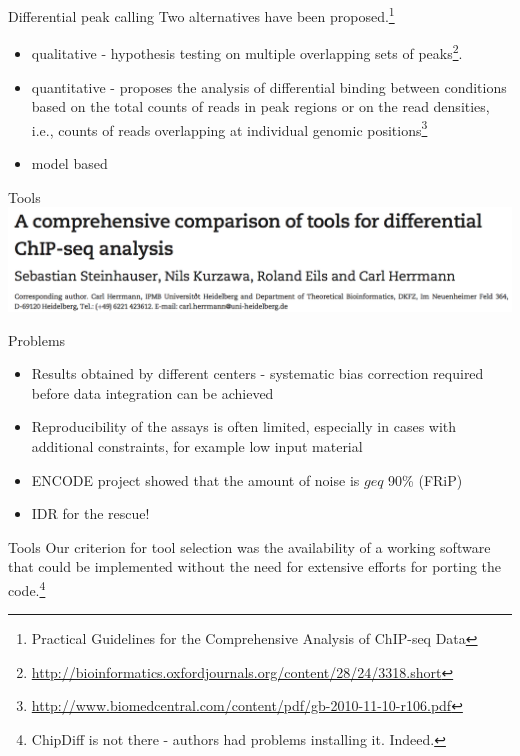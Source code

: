 \documentclass{beamer}
\begin{document}
\begin{frame}{Differential peak calling}
Two alternatives have been proposed.\footnote{Practical Guidelines for the Comprehensive Analysis of ChIP-seq Data}
\begin{itemize}
\item qualitative - hypothesis testing on multiple overlapping sets of peaks\footnote{\url{http://bioinformatics.oxfordjournals.org/content/28/24/3318.short}}.
\item quantitative -  proposes the analysis of differential binding between conditions based on the total counts of reads in peak regions or on the read densities, i.e., counts of reads overlapping at individual genomic positions\footnote{\url{http://www.biomedcentral.com/content/pdf/gb-2010-11-10-r106.pdf}}
\item model based
\end{itemize}
\end{frame}

\begin{frame}{Tools}
\includegraphics[width=\linewidth]{paperDPC.png}
\end{frame}

\begin{frame}{Problems}
\begin{itemize}
\item  Results obtained by different centers -  systematic bias correction required before data integration can be achieved
\item Reproducibility of the assays is often limited, especially in cases with additional constraints, for example low input material
\item ENCODE project showed that the amount of noise is ${geq}$ 90\% (FRiP)
\item IDR for the rescue!
\end{itemize}
\end{frame}

\begin{frame}{Tools}
 Our criterion for tool selection was the availability of a working software that could be implemented without the need for extensive efforts for porting the code.\footnote{ChipDiff is not there - authors had problems installing it. Indeed.}
\end{frame}
\end{document}
